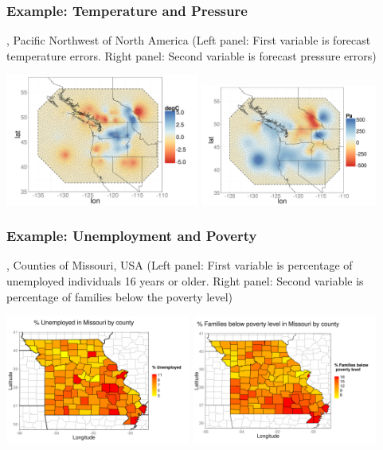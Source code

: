 \documentclass{beamer}
\begin{document}
\begin{frame}
\frametitle{Example: Temperature and Pressure}
\citet*{Gneitingetal2010}, Pacific Northwest of North America (Left panel: First variable is forecast temperature errors. Right panel: Second variable is forecast pressure errors)

\begin{center}
\includegraphics[width=2.5in]{./Temp.png}
\includegraphics[width=2.3in]{./Pressure.png}
\end{center}
\end{frame}


\begin{frame}
\frametitle{Example: Unemployment and Poverty}
\citet*{PorterWikleHolan}, Counties of Missouri, USA (Left panel: First variable is percentage of unemployed individuals 16 years or older. Right panel: Second variable is percentage of families below the poverty level)

\begin{center}
\includegraphics[width=2.4in]{./plot_unemployed.png}
\includegraphics[width=2.4in]{./plot_poverty.png}
\end{center}
\end{frame}
\end{document}
